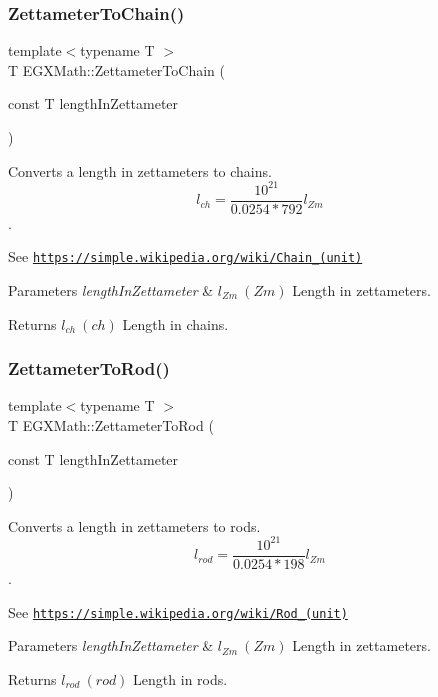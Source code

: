 \subsubsection{\texorpdfstring{Zettameter\+To\+Chain()}{ZettameterToChain()}}
{\footnotesize\ttfamily template$<$typename T $>$ \\
T E\+G\+X\+Math\+::\+Zettameter\+To\+Chain (\begin{DoxyParamCaption}\item[{const T}]{length\+In\+Zettameter }\end{DoxyParamCaption})}



Converts a length in zettameters to chains. \[ l_{ch}= \frac{10^{21}}{0.0254 * 792} l_{Zm} \]. 

See \href{https://simple.wikipedia.org/wiki/Chain_(unit)}{\tt https\+://simple.\+wikipedia.\+org/wiki/\+Chain\+\_\+(unit)} 
\begin{DoxyParams}{Parameters}
{\em length\+In\+Zettameter} & $ l_{Zm}\ (Zm)$ Length in zettameters. \\
\hline
\end{DoxyParams}
\begin{DoxyReturn}{Returns}
$ l_{ch}\ (ch)$ Length in chains. 
\end{DoxyReturn}
\mbox{\label{group___e_g_x_math-_conversions-_length_conversions-_s_i-_zettameter-_surveyors_gac9031bf1465b8a56ab426ac20d256741}} 
\subsubsection{\texorpdfstring{Zettameter\+To\+Rod()}{ZettameterToRod()}}
{\footnotesize\ttfamily template$<$typename T $>$ \\
T E\+G\+X\+Math\+::\+Zettameter\+To\+Rod (\begin{DoxyParamCaption}\item[{const T}]{length\+In\+Zettameter }\end{DoxyParamCaption})}



Converts a length in zettameters to rods. \[ l_{rod}= \frac{10^{21}}{0.0254 * 198} l_{Zm} \]. 

See \href{https://simple.wikipedia.org/wiki/Rod_(unit)}{\tt https\+://simple.\+wikipedia.\+org/wiki/\+Rod\+\_\+(unit)} 
\begin{DoxyParams}{Parameters}
{\em length\+In\+Zettameter} & $ l_{Zm}\ (Zm)$ Length in zettameters. \\
\hline
\end{DoxyParams}
\begin{DoxyReturn}{Returns}
$ l_{rod}\ (rod)$ Length in rods. 
\end{DoxyReturn}
